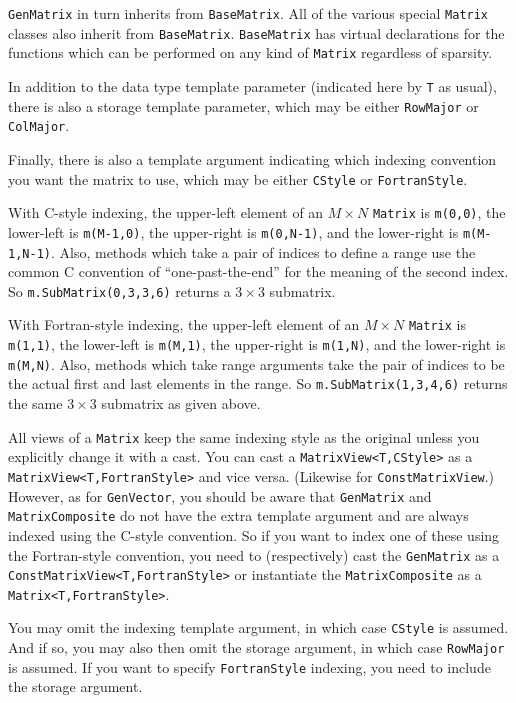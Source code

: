 \documentclass[twoside,letterpaper,11pt]{article}
\renewcommand{\tt}[1]{{\texttt {#1}}}
\begin{document}
\tt{GenMatrix} in turn inherits from \tt{BaseMatrix}.  All of the various
special \tt{Matrix} classes also inherit from \tt{BaseMatrix}.
\tt{BaseMatrix} has virtual declarations for the functions which can be 
performed on any kind of \tt{Matrix} regardless of sparsity.

In addition to the data type template parameter (indicated here by \tt{T} as usual),
there is also a storage template parameter, which may be either 
\tt{RowMajor} or \tt{ColMajor}.

Finally, there is also a template argument indicating which indexing convention
you want the matrix to use, which may be either \tt{CStyle} or 
\tt{FortranStyle}.

With C-style indexing, the upper-left element of an $M \times N$ \tt{Matrix} is
\tt{m(0,0)}, the lower-left is \tt{m(M-1,0)}, the upper-right is \tt{m(0,N-1)},
and the lower-right is \tt{m(M-1,N-1)}.  Also, methods which take a pair of 
indices to define a range use the common C convention of ``one-past-the-end'' 
for the meaning of the second index.
So \tt{m.SubMatrix(0,3,3,6)} returns a $3 \times 3$ submatrix.

With Fortran-style indexing, the upper-left element of an $M \times N$ \tt{Matrix}
is \tt{m(1,1)}, the lower-left is \tt{m(M,1)}, the upper-right is \tt{m(1,N)},
and the lower-right is \tt{m(M,N)}.  Also, methods which take range arguments
take the pair of indices to be the actual first and last elements in the range.
So \tt{m.SubMatrix(1,3,4,6)} returns the same $3 \times 3$ submatrix as given above.

All views of a \tt{Matrix} keep the same indexing style as the original unless you
explicitly change it with a cast.  You can cast a \tt{MatrixView<T,CStyle>}
as a \tt{MatrixView<T,FortranStyle>} and vice versa.  (Likewise for 
\tt{ConstMatrixView}.)  However, as for \tt{GenVector}, you should be
aware that \tt{GenMatrix}
and \tt{MatrixComposite} do not have the extra template argument and are always
indexed using the C-style convention.  So if you want to index one of these 
using the Fortran-style convention, you need to (respectively) cast the 
\tt{GenMatrix} as a \tt{ConstMatrixView<T,FortranStyle>} or instantiate the
\tt{MatrixComposite} as a \tt{Matrix<T,FortranStyle>}.

You may omit the indexing template argument, in which case \tt{CStyle} is assumed.
And if so, you may also then omit the storage argument, in which case \tt{RowMajor}
is assumed.  If you want to specify \tt{FortranStyle} indexing, you need
to include the storage argument.
\end{document}

